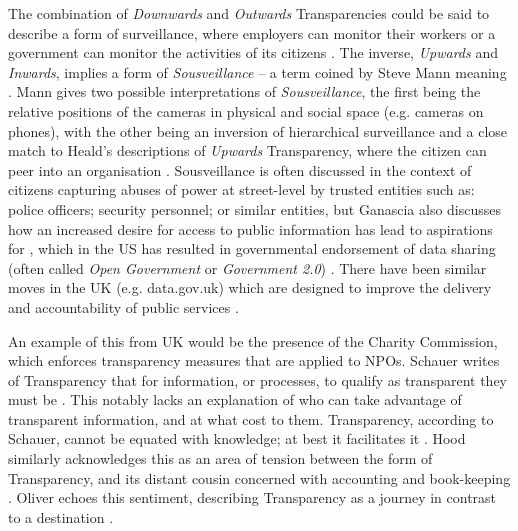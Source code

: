 The combination of \textit{Downwards} and \textit{Outwards} Transparencies could be said to describe a form of surveillance, where employers can monitor their workers or a government can monitor the activities of its citizens \cite{heald_varieties_2006}. The inverse, \textit{Upwards} and \textit{Inwards}, implies a form of \textit{Sousveillance} -- a term coined by Steve Mann meaning  \cite{mann_sousveillance:_2004}. Mann gives two possible interpretations of \textit{Sousveillance}, the first being the relative positions of the cameras in physical and social space (e.g. cameras on phones), with the other being an inversion of hierarchical surveillance and a close match to Heald's descriptions of \textit{Upwards} Transparency, where the citizen can peer into an organisation \cite{mann_sousveillance:_2004, heald_varieties_2006}. Sousveillance is often discussed in the context of citizens capturing abuses of power at street-level by trusted entities such as: police officers; security personnel; or similar entities, but Ganascia also discusses how an increased desire for access to public information has lead to aspirations for , which in the US has resulted in governmental endorsement of data sharing (often called \textit{Open Government} or \textit{Government 2.0}) \cite{ganascia_generalized_2010}. There have been similar moves in the UK (e.g. data.gov.uk) which are designed to improve the delivery and accountability of public services \cite{shadbolt_linked_2012}.

 An example of this from UK would be the presence of the Charity Commission, which enforces transparency measures that are applied to NPOs. Schauer writes of Transparency that for information, or processes, to qualify as transparent they must be  \cite{schauer_transparency_2011}. This notably lacks an explanation of who can take advantage of transparent information, and at what cost to them. Transparency, according to Schauer, cannot be equated with knowledge; at best it facilitates it \cite{schauer_transparency_2011}. Hood similarly acknowledges this as an area of tension between the  form of Transparency, and its distant cousin concerned with accounting and book-keeping \cite{hood_transparency_2006-1}. Oliver echoes this sentiment, describing Transparency as a journey in contrast to a destination \cite{oliver_what_2004}.

